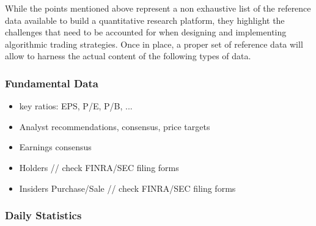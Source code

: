 While the points mentioned above represent a non exhaustive list of the reference data available to build a quantitative research platform, they highlight the challenges that need to be accounted for when designing and implementing algorithmic trading strategies. Once in place, a proper set of reference data will allow to harness the actual content of the following types of data.

\subsubsection{Fundamental Data}

\begin{itemize}
\item key ratios: EPS, P/E, P/B, ...
\item Analyst recommendations, consensus, price targets
\item Earnings consensus
\item Holders // check FINRA/SEC filing forms
\item Insiders Purchase/Sale // check FINRA/SEC filing forms
\end{itemize}

\subsubsection{Daily Statistics}

